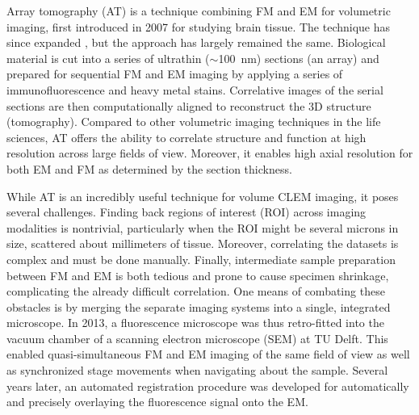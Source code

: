 

Array tomography (AT) is a technique combining FM and EM for volumetric imaging, first introduced in 2007 for studying brain tissue. The technique has since expanded%
, but the approach has largely remained the same. Biological material is cut into a series of ultrathin (${\sim}$\SI{100}{\nano\meter}) sections (an array) and prepared for sequential FM and EM imaging by applying a series of immunofluorescence and heavy metal stains. Correlative images of the serial sections are then computationally aligned to reconstruct the 3D structure (tomography). Compared to other volumetric imaging techniques in the life sciences, AT offers the ability to correlate structure and function at high resolution across large fields of view. Moreover, it enables high axial resolution%
for both EM and FM as determined by the section thickness.

While AT is an incredibly useful technique for%
volume CLEM imaging, it poses several challenges. Finding back regions of interest (ROI) across imaging modalities is nontrivial, particularly when the ROI might be several microns in size, scattered about millimeters of tissue. Moreover, correlating the datasets is complex and must be done manually. Finally, intermediate sample preparation between FM and EM is both tedious and prone to cause specimen shrinkage, complicating the already difficult correlation. One means of combating these obstacles is by merging the separate imaging systems into a single, integrated microscope. In 2013, a fluorescence microscope was thus retro-fitted into the vacuum chamber of a scanning electron microscope (SEM) at TU Delft. This enabled quasi-simultaneous FM and EM imaging of the same field of view as well as synchronized stage movements when navigating about the sample. Several years later, an automated registration procedure was developed for automatically and precisely overlaying the fluorescence signal onto the EM.%

